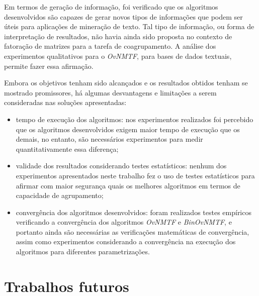 \documentclass[
    12pt,                %
    oneside,            %
    a4paper,            %
    english,            %
    brazil                %
    ]{abntex2ppgsi}
\begin{document}
Em termos de geração de informação, foi verificado que os algoritmos desenvolvidos são capazes de gerar novos tipos de informações que podem ser úteis para aplicações de mineração de texto.
Tal tipo de informação, ou forma de interpretação de resultados, não havia ainda sido proposta no contexto de fatoração de matrizes para a tarefa de coagrupamento.
A análise dos experimentos qualitativos para o \textit{OvNMTF}, para bases de dados textuais, permite fazer essa afirmação.

Embora os objetivos tenham sido alcançados e os resultados obtidos tenham se mostrado promissores, há algumas desvantagens e limitações a serem consideradas nas soluções apresentadas:
\begin{itemize}
    \item tempo de execução dos algoritmos: nos experimentos realizados foi percebido que os algoritmos desenvolvidos exigem maior tempo de execução que os demais, no entanto, são necessários experimentos para medir quantitativamente essa diferença;%
    \item validade dos resultados considerando testes estatísticos: nenhum dos experimentos apresentados neste trabalho fez o uso de testes estatísticos para afirmar com maior segurança quais os melhores algoritmos em termos de capacidade de agrupamento;
    \item convergência dos algoritmos desenvolvidos: foram realizados testes empíricos verificando a convergência dos algoritmos \textit{OvNMTF} e \textit{BinOvNMTF}, e portanto ainda são necessárias as verificações matemáticas de convergência, assim como experimentos considerando a convergência na execução dos algoritmos para diferentes parametrizações.
\end{itemize}


\section{Trabalhos futuros}
\end{document}
